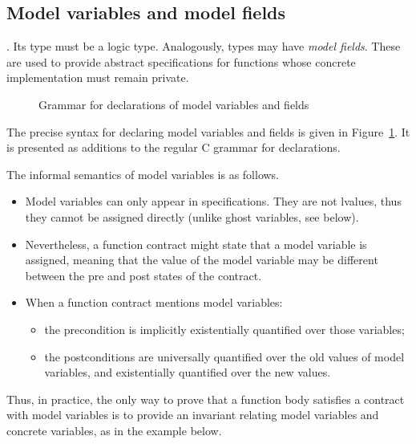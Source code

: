 
\subsection{Model variables and model fields}
\label{sec:model}
 . Its type must be a logic type. Analogously,
types may have \emph{model fields}.  These are
used to provide abstract specifications for functions whose concrete
implementation must remain private.

\begin{figure}[htp]
  \begin{cadre}
      
    \end{cadre}
  \caption{Grammar for declarations of model variables and fields}
\label{fig:gram:model}
\end{figure}


The precise syntax for declaring model variables and fields is given
in Figure~\ref{fig:gram:model}. It is presented as additions to the
regular C grammar for declarations.

The informal semantics of model variables is as follows.
\begin{itemize}
\item Model variables can only appear in specifications. They are not
  lvalues, thus they cannot be assigned directly (unlike ghost variables,
  see below).
\item Nevertheless, a function contract might state that a model variable
  is assigned, meaning that the value of the model variable may be different between the pre and post states of the contract.
\item When a function contract mentions model variables:
  \begin{itemize}
  \item the precondition is implicitly existentially quantified over
    those variables;
  \item the postconditions are universally quantified over the old
    values of model variables, and existentially quantified over the new values.
  \end{itemize}
\end{itemize}
Thus, in practice, the only way to prove that a function body
satisfies a contract with model variables is to provide an invariant
relating model variables and concrete variables, as in the example
below.

